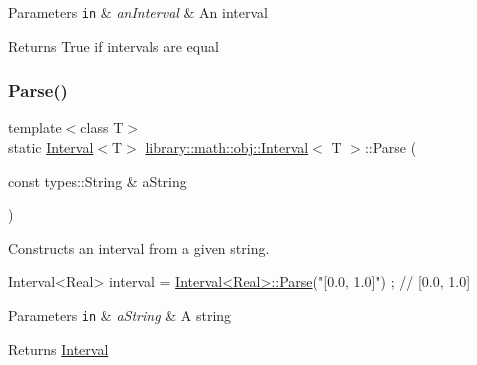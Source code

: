 \begin{DoxyParams}[1]{Parameters}
\mbox{\tt in}  & {\em an\+Interval} & An interval \\
\hline
\end{DoxyParams}
\begin{DoxyReturn}{Returns}
True if intervals are equal 
\end{DoxyReturn}
\mbox{\label{classlibrary_1_1math_1_1obj_1_1_interval_a9ed15c38ee04880a1aba75defa086a79}} 
\subsubsection{\texorpdfstring{Parse()}{Parse()}}
{\footnotesize\ttfamily template$<$class T$>$ \\
static \hyperlink{classlibrary_1_1math_1_1obj_1_1_interval}{Interval}$<$T$>$ \hyperlink{classlibrary_1_1math_1_1obj_1_1_interval}{library\+::math\+::obj\+::\+Interval}$<$ T $>$\+::Parse (\begin{DoxyParamCaption}\item[{const types\+::\+String \&}]{a\+String }\end{DoxyParamCaption})\hspace{0.3cm}{\ttfamily [static]}}



Constructs an interval from a given string. 


\begin{DoxyCode}
Interval<Real> interval = \hyperlink{classlibrary_1_1math_1_1obj_1_1_interval_a9ed15c38ee04880a1aba75defa086a79}{Interval<Real>::Parse}(\textcolor{stringliteral}{"[0.0, 1.0]"}) ; \textcolor{comment}{// [0.0, 1.0]}
\end{DoxyCode}



\begin{DoxyParams}[1]{Parameters}
\mbox{\tt in}  & {\em a\+String} & A string \\
\hline
\end{DoxyParams}
\begin{DoxyReturn}{Returns}
\hyperlink{classlibrary_1_1math_1_1obj_1_1_interval}{Interval} 
\end{DoxyReturn}
\mbox{\label{classlibrary_1_1math_1_1obj_1_1_interval_a5ceb8fb56f920193c8b18346992b5d02}} 
